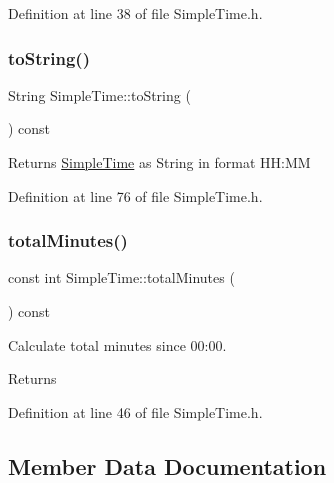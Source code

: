 Definition at line 38 of file Simple\+Time.\+h.

\mbox{\label{class_simple_time_a9de383bf9aaf23dbba9b13e0b9b4f0ed}} 
\subsubsection{\texorpdfstring{toString()}{toString()}}
{\footnotesize\ttfamily String Simple\+Time\+::to\+String (\begin{DoxyParamCaption}{ }\end{DoxyParamCaption}) const\hspace{0.3cm}{\ttfamily [inline]}}

\begin{DoxyReturn}{Returns}
\mbox{\hyperlink{class_simple_time}{Simple\+Time}} as String in format HH\+:MM 
\end{DoxyReturn}


Definition at line 76 of file Simple\+Time.\+h.

\mbox{\label{class_simple_time_a9fd5a5025ccd3bd60d4049c5c113ec4c}} 
\subsubsection{\texorpdfstring{totalMinutes()}{totalMinutes()}}
{\footnotesize\ttfamily const int Simple\+Time\+::total\+Minutes (\begin{DoxyParamCaption}{ }\end{DoxyParamCaption}) const\hspace{0.3cm}{\ttfamily [inline]}}

Calculate total minutes since 00\+:00. \begin{DoxyReturn}{Returns}

\end{DoxyReturn}


Definition at line 46 of file Simple\+Time.\+h.



\subsection{Member Data Documentation}
\mbox{\label{class_simple_time_a3818c7ef3b2f7d685e403f6bbf993bdc}} 
